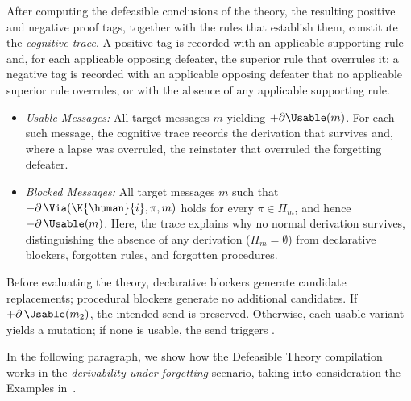 After computing the defeasible conclusions of the theory, the resulting positive and negative proof tags, together with the rules that establish them, constitute the \emph{cognitive trace}. A positive tag is recorded with an applicable supporting rule and, for each applicable opposing defeater, the superior rule that overrules it; a negative tag is recorded with an applicable opposing defeater that no applicable superior rule overrules, or with the absence of any applicable supporting rule.
\begin{itemize}
    \item \emph{Usable Messages:} All target messages $m$ yielding $+ \partial \Usable(m)$. For each such message, the cognitive trace records the derivation that survives and, where a lapse was overruled, the reinstater that overruled the forgetting defeater.
    \item \emph{Blocked Messages:} All target messages $m$ such that $-\partial\,\Via(\K{\human}{i},\pi,m)$ holds for every $\pi\in\Pi_m$, and hence $-\partial\,\Usable(m)$. Here, the trace explains why no normal derivation survives, distinguishing the absence of any derivation ($\Pi_m=\emptyset$) from declarative blockers, forgotten rules, and forgotten procedures.
\end{itemize}
Before evaluating the theory, declarative blockers generate candidate replacements; procedural blockers generate no additional candidates. If $+\partial\,\Usable(m_2)$, the intended send is preserved. Otherwise, each usable variant yields a \replace{} mutation; if none is usable, the send triggers \skipmutation{}. 

In the following paragraph, we show how the Defeasible Theory compilation works in the \textit{derivability under forgetting} scenario, taking into consideration the Examples in~.

